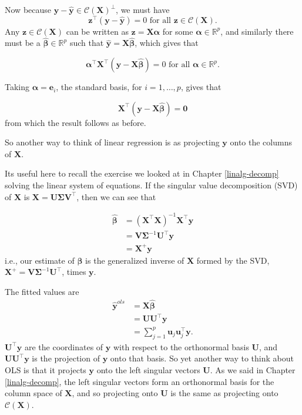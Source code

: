 \documentclass[
]{book}
\theoremstyle{definition}
\theoremstyle{definition}
\theoremstyle{definition}
\theoremstyle{definition}
\theoremstyle{remark}
\begin{document}
Now because \(\mathbf y-\hat{\mathbf y}\in \mathcal{C}(\mathbf X)^\perp\), we must have
\[\mathbf z^\top(\mathbf y-\hat{\mathbf y})=0 \mbox{ for all } \mathbf z\in \mathcal{C}(\mathbf X).\]
Any \(\mathbf z\in \mathcal{C}(\mathbf X)\) can be written as \(\mathbf z= \mathbf X\boldsymbol \alpha\) for some \(\boldsymbol \alpha\in \mathbb{R}^p\), and similarly there must be a \(\hat{\boldsymbol \beta}\in \mathbb{R}^p\) such that \(\hat{\mathbf y}=\mathbf X\hat{\boldsymbol \beta}\), which gives that

\[{\boldsymbol \alpha}^\top\mathbf X^\top (\mathbf y-\mathbf X\hat{\boldsymbol \beta})=0 \mbox{ for all } \boldsymbol \alpha\in \mathbb{R}^p.\]

Taking \(\boldsymbol \alpha= \mathbf e_i\), the standard basis, for \(i=1, \ldots, p\), gives that

\[\mathbf X^\top(\mathbf y-\mathbf X\hat{\boldsymbol \beta})=\boldsymbol 0\]
from which the result follows as before.

So another way to think of linear regression is as projecting \(\mathbf y\) onto the columns of \(\mathbf X\).

Its useful here to recall the exercise we looked at in Chapter \ref{linalg-decomp} solving the linear system of equations. If the singular value decomposition (SVD) of \(\mathbf X\) is \(\mathbf X= \mathbf U\boldsymbol{\Sigma}\mathbf V^\top\), then we can see that

\begin{align*}
\hat{\boldsymbol \beta}&=(\mathbf X^\top \mathbf X)^{-1}\mathbf X^\top \mathbf y\\
&=\mathbf V\boldsymbol{\Sigma}^{-1}\mathbf U^\top \mathbf y\\
&= \mathbf X^{+}\mathbf y
\end{align*}
i.e., our estimate of \(\boldsymbol \beta\) is the generalized inverse of \(\mathbf X\) formed by the SVD, \(\mathbf X^{+}=\mathbf V\boldsymbol{\Sigma}^{-1}\mathbf U^\top\), times \(\mathbf y\).

The fitted values are
\begin{align}
\hat{\mathbf y}^{ols} &= \mathbf X\hat{\boldsymbol \beta}\\
&=\mathbf U\mathbf U^\top \mathbf y\\
&=\sum_{j=1}^p \mathbf u_j \mathbf u_j^\top \mathbf y.\label{eq:lmsvd}
\end{align}
\(\mathbf U^\top \mathbf y\) are the coordinates of \(\mathbf y\) with respect to the orthonormal basis \(\mathbf U\), and \(\mathbf U\mathbf U^\top \mathbf y\) is the projection of \(\mathbf y\) onto that basis. So yet another way to think about OLS is that it projects \(\mathbf y\) onto the left singular vectors \(\mathbf U\). As we said in Chapter \ref{linalg-decomp}, the left singular vectors form an orthonormal basis for the column space of \(\mathbf X\), and so projecting onto \(\mathbf U\) is the same as projecting onto \(\mathcal{C}(\mathbf X)\).
\end{document}
